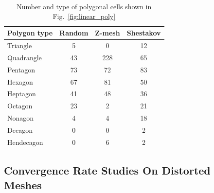 \documentclass[preprint,10pt]{elsarticle}
\newcommand{\fig}[1]{Fig.~\ref{#1}}                      %
\begin{document}
\begin{table}[!htbp]
	\centering
		\begin{tabular}{|l||c|c|c|}
		\hline
		Polygon type       &Random              & Z-mesh & Shestakov  \\ \hline\hline
Triangle  &   5 &  0 & 12 \\ \hline
Quadrangle&  43 & 228& 65 \\ \hline
Pentagon  &  73 & 72 & 83 \\ \hline
Hexagon   &  67 & 81 & 50 \\ \hline
Heptagon  &  41 & 48 & 36 \\ \hline
Octagon   &  23 & 2  & 21 \\ \hline
Nonagon   &   4 & 4  & 18 \\ \hline
Decagon   &   0 & 0  &  2 \\ \hline
Hendecagon&   0 & 6  &  2 \\ \hline		
		\end{tabular}
	\caption{Number and type of polygonal cells shown in \fig{fig:linear_poly}}
	\label{tab:poly_cell_types_linear_poly}
\end{table}

\pagebreak

\subsection{Convergence Rate Studies On Distorted Meshes} \label{sec:results_conv}
\end{document}
